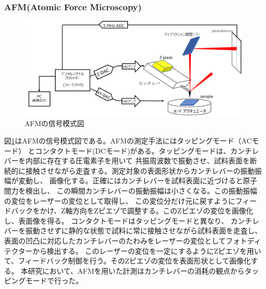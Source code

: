 \documentclass[dvipdfmx,12pt,a4paper]{jreport}
\begin{document}
		\subsubsection{AFM(Atomic Force Microscopy)}
		\begin{figure}[h]
			\centering
			\includegraphics[width=0.8\linewidth]{AFM.png}
			\caption{AFMの信号模式図}
			\label{stracture_of_AFM}
		\end{figure}
		図\ref{stracture_of_AFM}はAFMの信号模式図である。AFMの測定手法にはタッピングモード（ACモード）
		とコンタクトモード(DCモード)がある。タッピングモードは、カンチレバーを内部に存在する圧電素子を用いて
		共振周波数で振動させ、試料表面を断続的に接触させながら走査する。測定対象の表面形状からカンチレバーの振動振幅が変動し、
		画像化する。正確にはカンチレバーを試料表面に近づけると原子間力を検出し、
		この瞬間カンチレバーの振動振幅は小さくなる。この振動振幅の変位をレーザーの変位として取得し、
		この変位分だけ元に戻すようにフィードバックをかけ、Z軸方向をZピエゾで調整する。このZピエゾの変位を画像化し、表面像を得る。
		コンタクトモードはタッピングモードと異なり、
		カンチレバーを振動させずに静的な状態で試料に常に接触させながら試料表面を走査し、
		表面の凹凸に対応したカンチレバーのたわみをレーザーの変位としてフォトディテクターから検出する。
		このレーザーの変位を一定にするようにZピエゾを用いて、フィードバック制御を行う。そのZピエゾの変位を表面形状として画像化する。
		本研究において、AFMを用いた計測はカンチレバーの消耗の観点からタッピングモードで行った。
\end{document}
